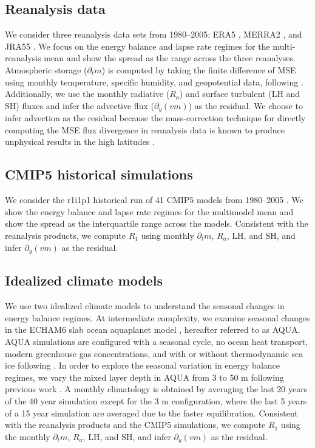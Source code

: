 \documentclass{ametsocV5}
\begin{document}
    \subsection{Reanalysis data}\label{subsec:reanalysis}
    We consider three reanalysis data sets from 1980--2005: ERA5 \citep{hersbach2020}, MERRA2 \citep{gelaro2017}, and JRA55 \citep{kobayashi2015}. We focus on the energy balance and lapse rate regimes for the multi-reanalysis mean and show the spread as the range across the three reanalyses. Atmospheric storage ($\partial_t m$) is computed by taking the finite difference of MSE using monthly temperature, specific humidity, and geopotential data, following \cite{donohoe2013}. Additionally, we use the monthly radiative ($R_a$) and surface turbulent ($\mathrm{LH}$ and $\mathrm{SH}$) fluxes and infer the advective flux ($\partial_y (vm)$) as the residual. We choose to infer advection as the residual because the mass-correction technique for directly computing the MSE flux divergence in reanalysis data is known to produce unphysical results in the high latitudes \citep{porter2010}. 

    \subsection{CMIP5 historical simulations}
    We consider the r1i1p1 historical run of 41 CMIP5 models from 1980--2005 \citep[Table~B1,][]{taylor2012}. We show the energy balance and lapse rate regimes for the multimodel mean and show the spread as the interquartile range across the models. Consistent with the reanalysis products, we compute $R_1$ using monthly $\partial_t m$, $R_a$, $\mathrm{LH}$, and $\mathrm{SH}$, and infer $\partial_y (vm) $ as the residual.

    \subsection{Idealized climate models}\label{subsec:models}
    We use two idealized climate models to understand the seasonal changes in energy balance regimes. At intermediate complexity, we examine seasonal changes in the ECHAM6 slab ocean aquaplanet model \citep{stevens2013}, hereafter referred to as AQUA. AQUA simulations are configured with a seasonal cycle, no ocean heat transport, modern greenhouse gas concentrations, and with or without thermodynamic sea ice following \cite{shaw2020}. In order to explore the seasonal variation in energy balance regimes, we vary the mixed layer depth in AQUA from 3 to 50 m following previous work \citep{donohoe2014, barpanda2020}. A monthly climatology is obtained by averaging the last 20 years of the 40 year simulation except for the 3 m configuration, where the last 5 years of a 15 year simulation are averaged due to the faster equilibration. Consistent with the reanalysis products and the CMIP5 simulations, we compute $R_1$ using the monthly $\partial_t m$, $R_a$, $\mathrm{LH}$, and $\mathrm{SH}$, and infer $\partial_y (vm) $ as the residual.
\end{document}
